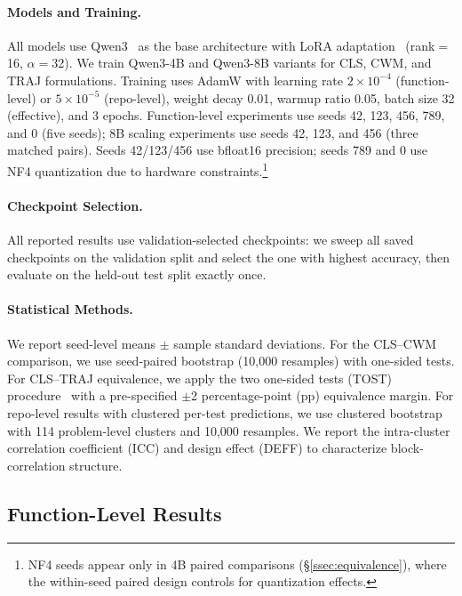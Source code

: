 \paragraph{Models and Training.}
All models use Qwen3~\citep{qwen2025qwen3} as the base architecture with LoRA adaptation~\citep{hu2022lora} (rank$=$16, $\alpha$$=$32).
We train Qwen3-4B and Qwen3-8B variants for CLS, CWM, and TRAJ formulations.
Training uses AdamW with learning rate $2 \times 10^{-4}$ (function-level) or $5 \times 10^{-5}$ (repo-level), weight decay 0.01, warmup ratio 0.05, batch size 32 (effective), and 3 epochs.
Function-level experiments use seeds 42, 123, 456, 789, and 0 (five seeds); 8B scaling experiments use seeds 42, 123, and 456 (three matched pairs).
Seeds 42/123/456 use bfloat16 precision; seeds 789 and 0 use NF4 quantization due to hardware constraints.\footnote{NF4 seeds appear only in 4B paired comparisons (\S\ref{ssec:equivalence}), where the within-seed paired design controls for quantization effects.}

\paragraph{Checkpoint Selection.}
All reported results use validation-selected checkpoints: we sweep all saved checkpoints on the validation split and select the one with highest accuracy, then evaluate on the held-out test split exactly once.

\paragraph{Statistical Methods.}
We report seed-level means $\pm$ sample standard deviations.
For the CLS--CWM comparison, we use seed-paired bootstrap (10,000 resamples) with one-sided tests.
For CLS--TRAJ equivalence, we apply the two one-sided tests (TOST) procedure~\citep{schuirmann1987tost} with a pre-specified $\pm$2 percentage-point (pp) equivalence margin.
For repo-level results with clustered per-test predictions, we use clustered bootstrap with 114 problem-level clusters and 10,000 resamples.
We report the intra-cluster correlation coefficient (ICC) and design effect (DEFF) to characterize block-correlation structure.


\subsection{Function-Level Results}
\label{ssec:func_results}


